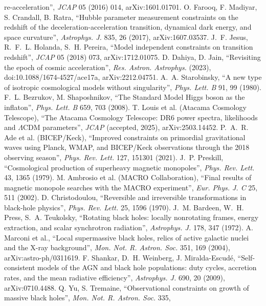 re-acceleration'', \emph{JCAP} 05 (2016) 014, arXiv:1601.01701.
 O. Farooq, F. Madiyar, S. Crandall, B. Ratra, ``Hubble parameter measurement constraints on the redshift of the
deceleration-acceleration transition, dynamical dark energy, and space curvature'', \emph{Astrophys. J.} 835, 26 (2017), arXiv:1607.03537.
 J.~F. Jesus, R.~F.~L. Holanda, S.~H. Pereira, ``Model independent constraints on transition redshift'', \emph{JCAP} 05
(2018) 073, arXiv:1712.01075.
 D. Dahiya, D. Jain, ``Revisiting the epoch of cosmic acceleration'', \emph{Res. Astron. Astrophys.} (2023),
doi:10.1088/1674-4527/ace17a, arXiv:2212.04751.
 A.~A. Starobinsky, ``A new type of isotropic cosmological models without singularity'', \emph{Phys. Lett. B} 91,
99 (1980).
 F.~L. Bezrukov, M. Shaposhnikov, ``The Standard Model Higgs boson as the inflaton'', \emph{Phys. Lett. B} 659, 703
(2008).
 T. Louis et al. (Atacama Cosmology Telescope), ``The Atacama Cosmology Telescope: DR6 power spectra, likelihoods and
$\Lambda$CDM parameters'', \emph{JCAP} (accepted, 2025), arXiv:2503.14452.
 P.~A.~R. Ade et al. (BICEP/Keck), ``Improved constraints on primordial gravitational waves using Planck, WMAP, and BICEP/Keck
observations through the 2018 observing season'', \emph{Phys. Rev. Lett.} 127, 151301 (2021).
 J.~P. Preskill, ``Cosmological production of superheavy magnetic monopoles'', \emph{Phys. Rev. Lett.} 43, 1365 (1979).
 M. Ambrosio et al. (MACRO Collaboration), ``Final results of magnetic monopole searches with the MACRO experiment'',
\emph{Eur. Phys. J. C} 25, 511 (2002).
 D. Christodoulou, ``Reversible and irreversible transformations in black-hole physics'', \emph{Phys. Rev. Lett.}
25, 1596 (1970).
 J.~M. Bardeen, W.~H. Press, S.~A. Teukolsky, ``Rotating black holes: locally nonrotating frames, energy extraction, and
scalar synchrotron radiation'', \emph{Astrophys. J.} 178, 347 (1972).
 A. Marconi et al., ``Local supermassive black holes, relics of active galactic nuclei and the X-ray background'',
\emph{Mon. Not. R. Astron. Soc.} 351, 169 (2004), arXiv:astro-ph/0311619.
 F. Shankar, D.~H. Weinberg, J. Miralda-Escud\'e, ``Self-consistent models of the AGN and black hole populations: duty
cycles, accretion rates, and the mean radiative efficiency'', \emph{Astrophys. J.} 690, 20 (2009), arXiv:0710.4488.
 Q. Yu, S. Tremaine, ``Observational constraints on growth of massive black holes'', \emph{Mon. Not. R. Astron. Soc.} 335,
